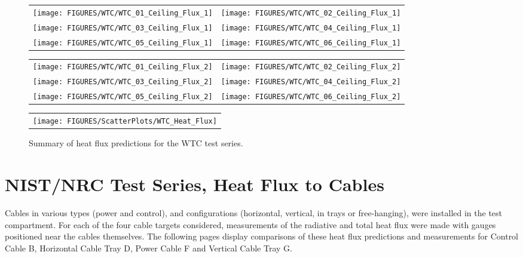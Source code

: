 \begin{figure}[p]
\begin{tabular*}{\textwidth}{l@{\extracolsep{\fill}}r}
\texttt{[image: FIGURES/WTC/WTC\_01\_Ceiling\_Flux\_1]} &
\texttt{[image: FIGURES/WTC/WTC\_02\_Ceiling\_Flux\_1]} \\
\texttt{[image: FIGURES/WTC/WTC\_03\_Ceiling\_Flux\_1]} &
\texttt{[image: FIGURES/WTC/WTC\_04\_Ceiling\_Flux\_1]} \\
\texttt{[image: FIGURES/WTC/WTC\_05\_Ceiling\_Flux\_1]} &
\texttt{[image: FIGURES/WTC/WTC\_06\_Ceiling\_Flux\_1]}
\end{tabular*}
\label{NIST_WTC_Ceiling_Flux_1}
\end{figure}

\begin{figure}[p]
\begin{tabular*}{\textwidth}{l@{\extracolsep{\fill}}r}
\texttt{[image: FIGURES/WTC/WTC\_01\_Ceiling\_Flux\_2]} &
\texttt{[image: FIGURES/WTC/WTC\_02\_Ceiling\_Flux\_2]} \\
\texttt{[image: FIGURES/WTC/WTC\_03\_Ceiling\_Flux\_2]} &
\texttt{[image: FIGURES/WTC/WTC\_04\_Ceiling\_Flux\_2]} \\
\texttt{[image: FIGURES/WTC/WTC\_05\_Ceiling\_Flux\_2]} &
\texttt{[image: FIGURES/WTC/WTC\_06\_Ceiling\_Flux\_2]}
\end{tabular*}
\label{NIST_WTC_Ceiling_Flux_2}
\end{figure}

\begin{figure}[p]
\begin{center}
\begin{tabular}{c}
\texttt{[image: FIGURES/ScatterPlots/WTC\_Heat\_Flux]}
\end{tabular}
\end{center}
\caption[Summary of heat flux predictions, WTC test series.]
{Summary of heat flux predictions for the WTC test series.}
\end{figure}



\clearpage

\section{NIST/NRC Test Series, Heat Flux to Cables}

Cables in various types (power and control), and configurations (horizontal, vertical, in trays or free-hanging), were installed in
the test compartment. For each of the four cable targets considered, measurements of the radiative and total heat flux were made with
gauges positioned near the cables themselves.  The following pages display comparisons of these heat flux predictions and measurements for
Control Cable B, Horizontal Cable Tray D, Power Cable F and Vertical Cable Tray G.

